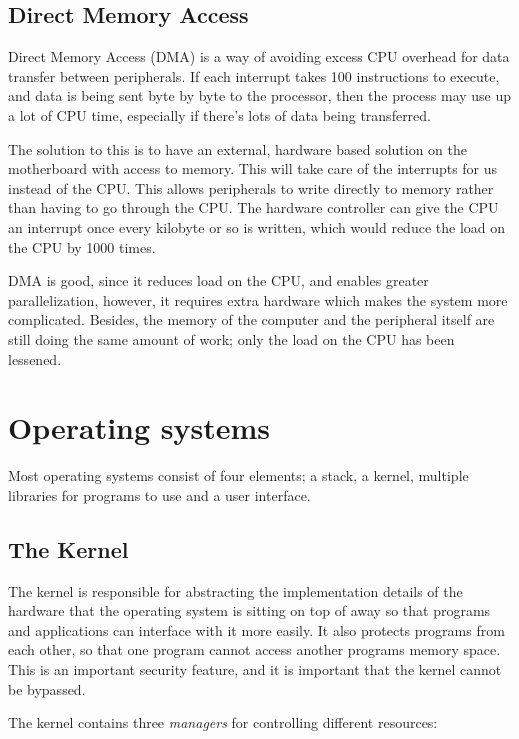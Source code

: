 \subsection{Direct Memory Access}

Direct Memory Access (DMA) is a way of avoiding excess CPU overhead for data
transfer between peripherals. If each interrupt takes 100 instructions to
execute, and data is being sent byte by byte to the processor, then the process
may use up a lot of CPU time, especially if there's lots of data being
transferred.

The solution to this is to have an external, hardware based solution on the
motherboard with access to memory. This will take care of the interrupts for us
instead of the CPU. This allows peripherals to write directly to memory rather
than having to go through the CPU. The hardware controller can give the CPU an
interrupt once every kilobyte or so is written, which would reduce the load on
the CPU by 1000 times.

DMA is good, since it reduces load on the CPU, and enables greater
parallelization, however, it requires extra hardware which makes the system more
complicated. Besides, the memory of the computer and the peripheral itself are
still doing the same amount of work; only the load on the CPU has been lessened.


\section{Operating systems}

Most operating systems consist of four elements; a stack, a kernel, multiple
libraries for programs to use and a user interface.

\subsection{The Kernel}

The kernel is responsible for abstracting the implementation details of the
hardware that the operating system is sitting on top of away so that programs
and applications can interface with it more easily. It also protects programs
from each other, so that one program cannot access another programs memory
space. This is an important security feature, and it is important that the
kernel cannot be bypassed.

The kernel contains three {\it managers} for controlling different resources:

